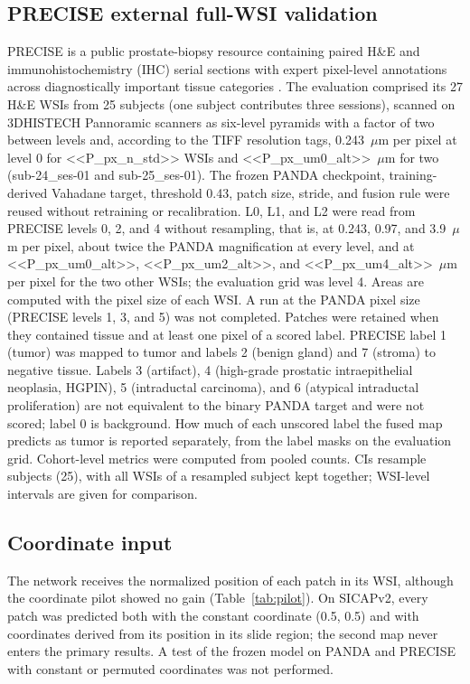 \documentclass[10pt,letterpaper]{article}
\begin{document}
\subsection*{PRECISE external full-WSI validation}
PRECISE is a public prostate-biopsy resource containing paired H\&E and immunohistochemistry (IHC) serial sections with expert pixel-level annotations across diagnostically important tissue categories \cite{bib46,bibPRECISEdata}. The evaluation comprised its 27 H\&E WSIs from 25 subjects (one subject contributes three sessions), scanned on 3DHISTECH Pannoramic scanners as six-level pyramids with a factor of two between levels and, according to the TIFF resolution tags, 0.243~$\mu$m per pixel at level 0 for <<P_px_n_std>> WSIs and <<P_px_um0_alt>>~$\mu$m for two (sub-24\_ses-01 and sub-25\_ses-01). The frozen PANDA checkpoint, training-derived Vahadane target, threshold 0.43, patch size, stride, and fusion rule were reused without retraining or recalibration. L0, L1, and L2 were read from PRECISE levels 0, 2, and 4 without resampling, that is, at 0.243, 0.97, and 3.9~$\mu$m per pixel, about twice the PANDA magnification at every level, and at <<P_px_um0_alt>>, <<P_px_um2_alt>>, and <<P_px_um4_alt>>~$\mu$m per pixel for the two other WSIs; the evaluation grid was level 4. Areas are computed with the pixel size of each WSI. A run at the PANDA pixel size (PRECISE levels 1, 3, and 5) was not completed. Patches were retained when they contained tissue and at least one pixel of a scored label. PRECISE label 1 (tumor) was mapped to tumor and labels 2 (benign gland) and 7 (stroma) to negative tissue. Labels 3 (artifact), 4 (high-grade prostatic intraepithelial neoplasia, HGPIN), 5 (intraductal carcinoma), and 6 (atypical intraductal proliferation) are not equivalent to the binary PANDA target and were not scored; label 0 is background. How much of each unscored label the fused map predicts as tumor is reported separately, from the label masks on the evaluation grid. Cohort-level metrics were computed from pooled counts. CIs resample subjects (25), with all WSIs of a resampled subject kept together; WSI-level intervals are given for comparison.

\subsection*{Coordinate input}
The network receives the normalized position of each patch in its WSI, although the coordinate pilot showed no gain (Table~\ref{tab:pilot}). On SICAPv2, every patch was predicted both with the constant coordinate (0.5, 0.5) and with coordinates derived from its position in its slide region; the second map never enters the primary results. A test of the frozen model on PANDA and PRECISE with constant or permuted coordinates was not performed.
\end{document}
